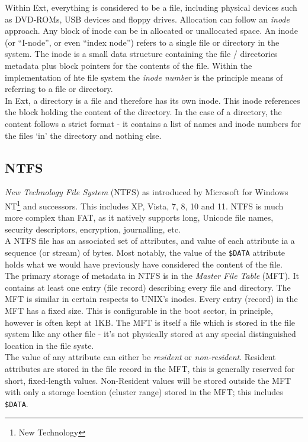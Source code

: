 Within Ext, everything is considered to be a file, including physical devices such as DVD-ROMs, USB devices and floppy drives. Allocation can follow an \textit{inode} approach. Any block of inode can be in allocated or unallocated space. An inode (or ``I-node'', or even ``index node'') refers to a single file or directory in the system. The inode is a small data structure containing the file / directories metadata plus block pointers for the contents of the file. Within the implementation of hte file system the \textit{inode number} is the principle means of referring to a file or directory.\\

In Ext, a directory is a file and therefore has its own inode. This inode references the block holding the content of the directory. In the case of a directory, the content follows a strict format - it contains a list of names and inode numbers for the files `in' the directory and nothing else.

\subsection{NTFS}
\textit{New Technology File System} (NTFS) as introduced by Microsoft for Windows NT\footnote{New Technology} and successors. This includes XP, Vista, 7, 8, 10 and 11. NTFS is much more complex than FAT, as it natively supports long, Unicode file names, security descriptors, encryption, journalling, etc.\\

A NTFS file has an associated set of attributes, and value of each attribute ia a sequence (or stream) of bytes. Most notably, the value of the \verb|$DATA| attribute holds what we would have previously have considered the content of the file.\\

The primary storage of metadata in NTFS is in the \textit{Master File Table} (MFT). It contains at least one entry (file record) describing every file and directory. The MFT is similar in certain respects to UNIX's inodes. Every entry (record) in the MFT has a fixed size. This is configurable in the boot sector, in principle, however is often kept at 1KB. The MFT is itself a file which is stored in the file system like any other file - it's not physically stored at any special distinguished location in the file syste.\\

The value of any attribute can either be \textit{resident} or \textit{non-resident}. Resident attributes are stored in the file record in the MFT, this is generally reserved for short, fixed-length values. Non-Resident values will be stored outside the MFT with only a storage location (cluster range) stored in the MFT; this includes \verb|$DATA|. 